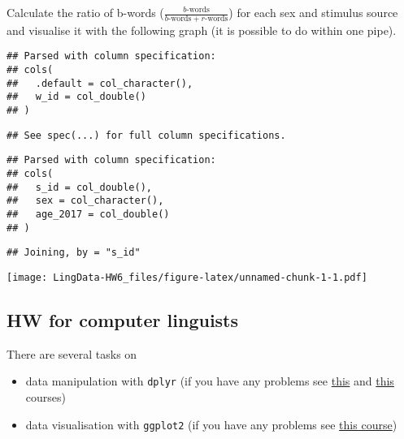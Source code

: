 \documentclass[]{article}
\providecommand{\tightlist}{%
  \setlength{\itemsep}{0pt}\setlength{\parskip}{0pt}}
\begin{document}
Calculate the ratio of b-words
(\(\frac{b\text{-words}}{b\text{-words}+r\text{-words}}\)) for each sex
and stimulus source and visualise it with the following graph (it is
possible to do within one pipe).

\begin{verbatim}
## Parsed with column specification:
## cols(
##   .default = col_character(),
##   w_id = col_double()
## )
\end{verbatim}

\begin{verbatim}
## See spec(...) for full column specifications.
\end{verbatim}

\begin{verbatim}
## Parsed with column specification:
## cols(
##   s_id = col_double(),
##   sex = col_character(),
##   age_2017 = col_double()
## )
\end{verbatim}

\begin{verbatim}
## Joining, by = "s_id"
\end{verbatim}

\texttt{[image: LingData-HW6\_files/figure-latex/unnamed-chunk-1-1.pdf]}

\subsection{HW for computer linguists}\label{hw-for-computer-linguists}

There are several tasks on

\begin{itemize}
\tightlist
\item
  data manipulation with \texttt{dplyr} (if you have any problems see
  \href{https://www.datacamp.com/courses/dplyr-data-manipulation-r-tutorial}{this}
  and
  \href{https://www.datacamp.com/courses/joining-data-in-r-with-dplyr}{this}
  courses)
\item
  data visualisation with \texttt{ggplot2} (if you have any problems see
  \href{https://www.datacamp.com/courses/data-visualization-with-ggplot2-1}{this
  course})
\end{itemize}
\end{document}
